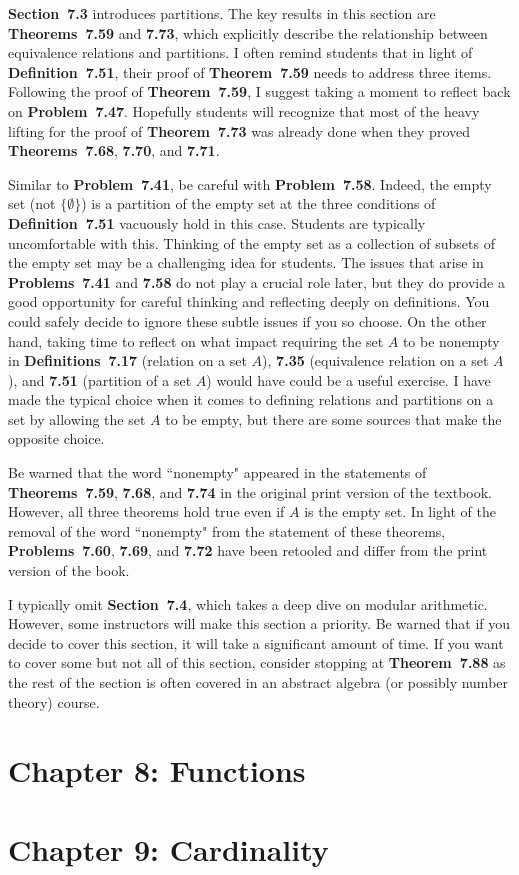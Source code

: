 \documentclass[11pt]{article}%
\newcommand{\blankline}{\pagebreak[2]\vspace{.5\baselineskip}}
\begin{document}
\blankline

\textbf{Section~7.3} introduces partitions.  The key results in this section are \textbf{Theorems~7.59} and \textbf{7.73}, which explicitly describe the relationship between equivalence relations and partitions.  I often remind students that in light of \textbf{Definition~7.51}, their proof of \textbf{Theorem~7.59} needs to address three items. Following the proof of \textbf{Theorem~7.59}, I suggest taking a moment to reflect back on \textbf{Problem~7.47}. Hopefully students will recognize that most of the heavy lifting for the proof of \textbf{Theorem~7.73} was already done when they proved \textbf{Theorems~7.68}, \textbf{7.70}, and \textbf{7.71}.

\blankline

Similar to \textbf{Problem~7.41}, be careful with \textbf{Problem~7.58}. Indeed, the empty set (not $\{\emptyset\}$) is a partition of the empty set at the three conditions of \textbf{Definition~7.51} vacuously hold in this case.  Students are typically uncomfortable with this. Thinking of the empty set as a collection of subsets of the empty set may be a challenging idea for students.  The issues that arise in \textbf{Problems~7.41} and \textbf{7.58} do not play a crucial role later, but they do provide a good opportunity for careful thinking and reflecting deeply on definitions.  You could safely decide to ignore these subtle issues if you so choose.  On the other hand, taking time to reflect on what impact requiring the set $A$ to be nonempty in \textbf{Definitions~7.17} (relation on a set $A$), \textbf{7.35} (equivalence relation on a set $A$), and \textbf{7.51} (partition of a set $A$) would have could be a useful exercise.  I have made the typical choice when it comes to defining relations and partitions on a set by allowing the set $A$ to be empty, but there are some sources that make the opposite choice.

\blankline

Be warned that the word ``nonempty" appeared in the statements of \textbf{Theorems~7.59}, \textbf{7.68}, and \textbf{7.74} in the original print version of the textbook.  However, all three theorems hold true even if $A$ is the empty set.  In light of the removal of the word ``nonempty" from the statement of these theorems, \textbf{Problems~7.60}, \textbf{7.69}, and \textbf{7.72} have been retooled and differ from the print version of the book.

\blankline

I typically omit \textbf{Section~7.4}, which takes a deep dive on modular arithmetic.  However, some instructors will make this section a priority.  Be warned that if you decide to cover this section, it will take a significant amount of time.  If you want to cover some but not all of this section, consider stopping at \textbf{Theorem~7.88} as the rest of the section is often covered in an abstract algebra (or possibly number theory) course.


\section*{Chapter 8: Functions}


\section*{Chapter 9: Cardinality}
\end{document}
